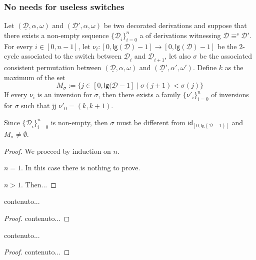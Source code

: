 \documentclass[a4paper,UKenglish,cleveref,pdftex, thm-restate,numberwithinsect]{lipics}
\newcommand{\id}[1]{\mathsf{id}_{#1}}
\newcommand{\dder}[1]{\mathscr{#1}}
\newcommand{\der}[1]{\underline{\dder{#1}}}
\newcommand{\lgh}[0]{\mathsf{lg}}
\begin{document}
\begin{example}\label{ex:contro}
\end{example}




\subsubsection{No needs for useless switches}

\begin{lemma} Let $(\der{D}, \alpha, \omega)$ and $(\der{D'}, \alpha, \omega)$ be two decorated derivations and suppose that there exists a non-empty sequence $\{\der{D}_i\}_{i=0}^n$ a of derivations witnessing $\der{D}\equiv^s \der{D}'$. For every $i\in [0,n-1]$, let $\nu_i\colon [0, \lgh(\der{D})-1]\to [0, \lgh(\der{D})-1]$ be the $2$-cycle associated to the switch between $\der{D}_i$ and $\der{D}_{i+1}$, let also $\sigma$ be the associated consistent permutation between $(\der{D}, \alpha, \omega)$ and $(\der{D}', \alpha', \omega')$. Define $k$ as the maximum of the set
\[M_\sigma:=\{j\in [0, \lgh(\der{D}-1] \mid \sigma(j+1) < \sigma(j) \}\]
If every $\nu_i$ is an inversion for $\sigma$, then there exists a family $\{\nu'_i\}_{i=0}^n$ of inversions for $\sigma$ such that jj $\nu'_0=(k, k+1)$.
\end{lemma}
\begin{remark}
	Since $\{\der{D}_i\}_{i=0}^n$ is non-empty, then $\sigma$ must be different from $\id{[0, \lgh(\der{D}-1)]}$ and $M_{\sigma}\neq \emptyset$.
\end{remark}
\begin{proof}
	We proceed by induction on $n$.
	
	\smallskip\noindent $n=1$. In this case there is nothing to prove.
	
	\smallskip \noindent $n>1$. Then...
\end{proof}

\begin{corollary}
	contenuto...
\end{corollary}
\begin{proof}
	contenuto...
\end{proof}


\begin{corollary}
	contenuto...
\end{corollary}
\begin{proof}
	contenuto...
\end{proof}
\end{document}
